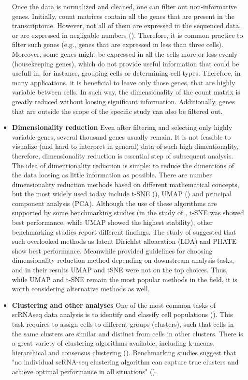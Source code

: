 \begin{itemize}
Once the data is normalized and cleaned, one can filter out non-informative genes.
Initially, count matrices contain all the genes that are present in the transcriptome.
However, not all of them are expressed in the sequenced data, or are expressed in negligable numbers (\cite{Heumos2023}).
Therefore, it is common practice to filter such genes (e.g., genes that are expressed in less than three cells).
Moreover, some genes might be expressed in all the cells more or less evenly (housekeeping genes),
which do not provide useful information that could be usefull in, for instance, grouping cells or determining cell types.
Therefore, in many applications, it is beneficial to leave only those genes, that are highly variable between cells.
In such way, the dimensionality of the count matrix is greatly reduced without loosing significant information.
Additionally, genes that are outside the scope of the specific study can also be filtered out.
\item \textbf{Dimensionality reduction}
Even after filtering and selecting only highly variable genes, several thousand genes usually remain.
It is not feasible to visualize (and hard to interpret in general) data of such high dimentionality, therefore,
dimensionality reduction is essential step of subsequent analysis.
The idea of dimentionality reduction is simple:
to reduce the dimentions of the data loosing as little information as possible.
There are number dimensionality reduction methods based on different mathematical concepts,
but the most widely used today include
t-SNE (\cite{Hinton2002}), UMAP (\cite{McInnes2018}) and principal component analysis (PCA).
Although the use of these algorithms are supported by some benchmarking studies
(in the study of \textcite{Xiang2021}, t-SNE was showed best performance, while UMAP showed the highest stability),
other benchmarking studies report different findings.
The study of \textcite{Koch2021} suggested that such overlooked methods as
latent Dirichlet alloacation (LDA) and PHATE show best performance.
Meanwhile \textcite{Sun2019} provided guidelines for choosing dimensionality reduction method
depending on downstream analysis tasks, and in their results UMAP and tSNE were not on the top choices.
Thus, while UMAP and t-SNE remain the most popular methods in the field,
it is worth considering alternative methods as well.
\item \textbf{Clustering and other analyses}
One of the most common tasks of scRNAseq data analysis is to identify and classify cell populations (\cite{Andrews2018}).
This task requires to assign cells to different groups (clusters),
such that cells in the same clusters are similar and distinct from cells in other clusters.
There is a great variety of clustering algorithms available,
including k-means, hierarchical and consensus clustering (\cite{Peng2020}).
Benchmarking studies suggest that "no individual scRNA-seq clustering algorithm can capture true clusters and achieve
optimal performance in all situations" (\cite{Peng2020}).


\end{itemize}
